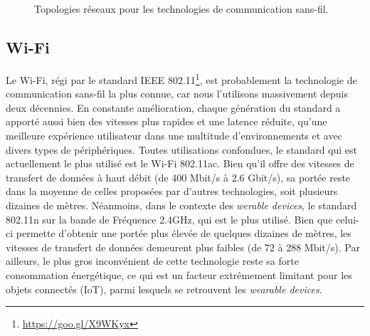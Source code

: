 \begin{figure}[H]
    \centering
    \hspace*{.2\linewidth}
    \\[30pt]
    \hspace*{.1\linewidth}
    \\[30pt]
	\caption{Topologies réseaux pour les technologies de communication sans-fil.}
\end{figure}

\subsection{Wi-Fi}
Le Wi-Fi, régi par le standard IEEE 802.11\footnote{\url{https://goo.gl/X9WKyx}}, est probablement la technologie de communication sans-fil la plus connue, car nous l'utilisons massivement depuis deux décennies. En constante amélioration, chaque génération du standard a apporté aussi bien des vitesses plus rapides et une latence réduite, qu'une meilleure expérience utilisateur dans une multitude d'environnements et avec divers types de périphériques. Toutes utilisations confondues, le standard qui est actuellement le plus utilisé est le Wi-Fi 802.11ac. Bien qu'il offre des vitesses de transfert de données à haut débit (de 400 Mbit/s à 2.6 Gbit/s), sa portée reste dans la moyenne de celles proposées par d'autres technologies, soit plusieurs dizaines de mètres. Néanmoins, dans le contexte des \textit{werable devices}, le standard 802.11n sur la bande de Fréquence 2.4GHz, qui est le plus utilisé. Bien que celui-ci permette d'obtenir une portée plus élevée de quelques dizaines de mètres, les  vitesses de transfert de données demeurent plus faibles (de 72 à 288 Mbit/s). Par ailleurs, le plus gros inconvénient de cette technologie reste sa forte consommation énergétique, ce qui est un facteur extrêmement limitant pour les objets connectés (\acs{IoT}), parmi lesquels se retrouvent les \textit{wearable devices}.


